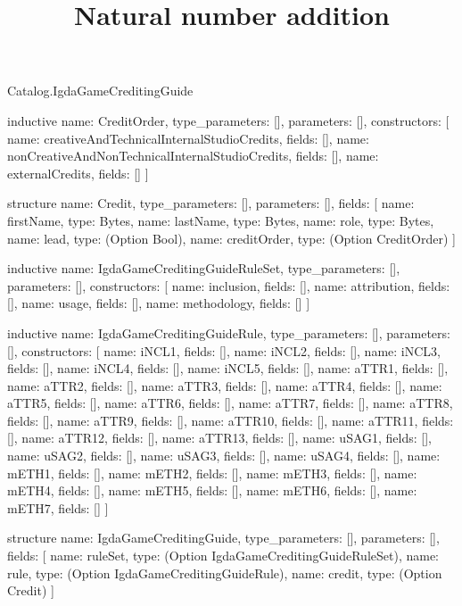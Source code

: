 \begin{lexlean}{Catalog.IgdaGameCreditingGuide}
\title{Natural number addition}
\begin{semanticmodule}
inductive{
  name: CreditOrder,
  type_parameters: [],
  parameters: [],
  constructors: [
    {name: creativeAndTechnicalInternalStudioCredits, fields: []},
    {name: nonCreativeAndNonTechnicalInternalStudioCredits, fields: []},
    {name: externalCredits, fields: []}
  ]
}

structure{
  name: Credit,
  type_parameters: [],
  parameters: [],
  fields: [
    {name: firstName, type: Bytes},
    {name: lastName, type: Bytes},
    {name: role, type: Bytes},
    {name: lead, type: (Option Bool)},
    {name: creditOrder, type: (Option CreditOrder)}
  ]
}

inductive{
  name: IgdaGameCreditingGuideRuleSet,
  type_parameters: [],
  parameters: [],
  constructors: [
    {name: inclusion, fields: []},
    {name: attribution, fields: []},
    {name: usage, fields: []},
    {name: methodology, fields: []}
  ]
}

inductive{
  name: IgdaGameCreditingGuideRule,
  type_parameters: [],
  parameters: [],
  constructors: [
    {name: iNCL1, fields: []},
    {name: iNCL2, fields: []},
    {name: iNCL3, fields: []},
    {name: iNCL4, fields: []},
    {name: iNCL5, fields: []},
    {name: aTTR1, fields: []},
    {name: aTTR2, fields: []},
    {name: aTTR3, fields: []},
    {name: aTTR4, fields: []},
    {name: aTTR5, fields: []},
    {name: aTTR6, fields: []},
    {name: aTTR7, fields: []},
    {name: aTTR8, fields: []},
    {name: aTTR9, fields: []},
    {name: aTTR10, fields: []},
    {name: aTTR11, fields: []},
    {name: aTTR12, fields: []},
    {name: aTTR13, fields: []},
    {name: uSAG1, fields: []},
    {name: uSAG2, fields: []},
    {name: uSAG3, fields: []},
    {name: uSAG4, fields: []},
    {name: mETH1, fields: []},
    {name: mETH2, fields: []},
    {name: mETH3, fields: []},
    {name: mETH4, fields: []},
    {name: mETH5, fields: []},
    {name: mETH6, fields: []},
    {name: mETH7, fields: []}
  ]
}

structure{
  name: IgdaGameCreditingGuide,
  type_parameters: [],
  parameters: [],
  fields: [
    {name: ruleSet, type: (Option IgdaGameCreditingGuideRuleSet)},
    {name: rule, type: (Option IgdaGameCreditingGuideRule)},
    {name: credit, type: (Option Credit)}
  ]
}
\end{semanticmodule}
\end{lexlean}
